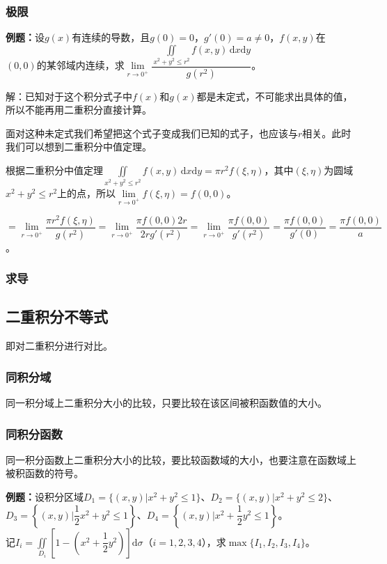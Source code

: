 \subsubsection{极限}

\textbf{例题：}设$g(x)$有连续的导数，且$g(0)=0$，$g'(0)=a\neq0$，$f(x,y)$在$(0,0)$的某邻域内连续，求$\lim\limits_{r\to0^+}\dfrac{\iint\limits_{x^2+y^2\leqslant r^2}f(x,y)\,\textrm{d}x\textrm{d}y}{g(r^2)}$。

解：已知对于这个积分式子中$f(x)$和$g(x)$都是未定式，不可能求出具体的值，所以不能再用二重积分直接计算。

面对这种未定式我们希望把这个式子变成我们已知的式子，也应该与$r$相关。此时我们可以想到二重积分中值定理。

根据二重积分中值定理$\iint\limits_{x^2+y^2\leqslant r^2}f(x,y)\,\textrm{d}x\textrm{d}y=\pi r^2f(\xi,\eta)$，其中$(\xi,\eta)$为圆域$x^2+y^2\leqslant r^2$上的点，所以$\lim\limits_{r\to0^+}f(\xi,\eta)=f(0,0)$。

$=\lim\limits_{r\to0^+}\dfrac{\pi r^2f(\xi,\eta)}{g(r^2)}=\lim\limits_{r\to0^+}\dfrac{\pi f(0,0)2r}{2rg'(r^2)}=\lim\limits_{r\to0^+}\dfrac{\pi f(0,0)}{g'(r^2)}=\dfrac{\pi f(0,0)}{g'(0)}=\dfrac{\pi f(0,0)}{a}$。

\subsubsection{求导}

\subsection{二重积分不等式}

即对二重积分进行对比。

\subsubsection{同积分域}

同一积分域上二重积分大小的比较，只要比较在该区间被积函数值的大小。

\subsubsection{同积分函数}

同一积分函数上二重积分大小的比较，要比较函数域的大小，也要注意在函数域上被积函数的符号。

\textbf{例题：}设积分区域$D_1=\{(x,y)|x^2+y^2\leqslant1\}$、$D_2=\{(x,y)|x^2+y^2\leqslant2\}$、$D_3=\left\{(x,y)|\dfrac{1}{2}x^2+y^2\leqslant1\right\}$、$D_4=\left\{(x,y)|x^2+\dfrac{1}{2}y^2\leqslant1\right\}$。\\记$I_i=\iint\limits_{D_i}\left[1-\left(x^2+\dfrac{1}{2}y^2\right)\right]\textrm{d}\sigma$（$i=1,2,3,4$），求$\max\{I_1,I_2,I_3,I_4\}$。

